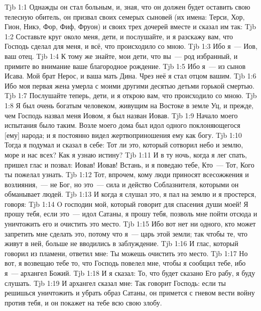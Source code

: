 \vs Tjb 1:1
Однажды он стал больным, и, зная, что он должен будет оставить свою телесную обитель, он призвал своих семерых сыновей (их имена: Терси, Хор, Гион, Никэ, Фор, Фиф, Фруон) и своих трех дочерей вместе и сказал им так:
\vs Tjb 1:2
Составьте круг около меня, дети, и послушайте, и я разскажу вам, что Господь сделал для меня, и всё, что происходило со мною.
\vs Tjb 1:3
Ибо я~--- Иов, ваш отец.
\vs Tjb 1:4
К тому же знайте, мои дети, что вы~--- род избранный, и примите во внимание ваше благородное рождение.
\vs Tjb 1:5
Ибо я~--- из сынов Исава. Мой брат Нерос, и ваша мать Дина. Чрез неё я стал отцом вашим.
\vs Tjb 1:6
Ибо моя первая жена умерла с моими другими десятью детьми горькой смертью.
\vs Tjb 1:7
Послушайте теперь, дети, и я открою вам, что происходило со мною.
\vs Tjb 1:8
Я был очень богатым человеком, живущим на Востоке в земле Уц, и прежде, чем Господь назвал меня Иовом, я был назван Иовав.
\vs Tjb 1:9
Начало моего испытания было таким. Возле моего дома был идол одного поклоняющегося [ему] народа; и я постоянно видел жертвоприношения ему как богу.
\vs Tjb 1:10
Тогда я подумал и сказал в себе: Тот ли это, который сотворил небо и землю, море и нас всех? Как я узнаю истину?
\vs Tjb 1:11
И в ту ночь, когда я лег спать, пришел глас и позвал: Иовав! Иовав! Встань, и я поведаю тебе, Кто~--- Тот, Кого ты пожелал узнать.
\vs Tjb 1:12
Тот, впрочем, кому люди приносят всесожжения и возлияния,~--- не Бог, но это~--- сила и действо Соблазнителя, которыми он обманывает людей.
\vs Tjb 1:13
И когда я слушал это, я пал на землю и я простерся, говоря:
\vs Tjb 1:14
O господин мой, который говорит для спасения души моей! Я прошу тебя, если это~--- идол Сатаны, я прошу тебя, позволь мне пойти отсюда и уничтожить его и очистить это место.
\vs Tjb 1:15
Ибо вот нет ни одного, кто может запретить мне сделать это, потому что я~--- царь этой земли; так чтобы те, что живут в ней, больше не вводились в заблуждение.
\vs Tjb 1:16
И глас, который говорил из пламени, ответил мне: Ты можешь очистить это место.
\vs Tjb 1:17
Но вот, я возвещаю тебе то, что Господь повелел мне, чтобы я сообщил тебе, ибо я~--- архангел Божий.
\vs Tjb 1:18
И я сказал: То, что будет сказано Его рабу, я буду слушать.
\vs Tjb 1:19
И архангел сказал мне: Так говорит Господь: если ты решишься уничтожить и убрать образ Сатаны, он примется с гневом вести войну против тебя, и он покажет на тебе всю свою злобу.
